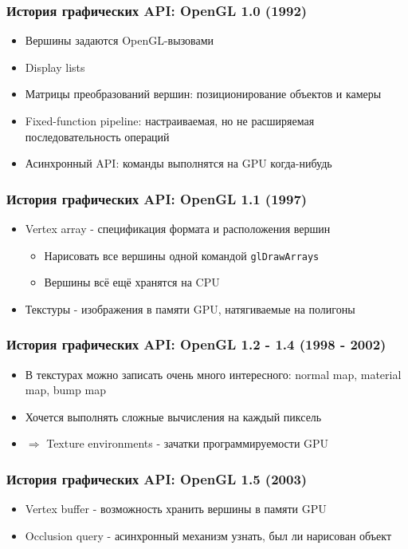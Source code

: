 \documentclass{beamer}
\begin{document}
\begin{frame}
\frametitle{История графических API: OpenGL 1.0 (1992)}
\begin{itemize}
\item Вершины задаются OpenGL-вызовами
\item Display lists
\item Матрицы преобразований вершин: позиционирование объектов и камеры
\item Fixed-function pipeline: настраиваемая, но не расширяемая последовательность операций
\item Асинхронный API: команды выполнятся на GPU когда-нибудь
\end{itemize}
\end{frame}

\begin{frame}[fragile]
\frametitle{История графических API: OpenGL 1.1 (1997)}
\begin{itemize}
\item Vertex array - спецификация формата и расположения вершин
\begin{itemize}
\item Нарисовать все вершины одной командой \verb|glDrawArrays|
\item Вершины всё ещё хранятся на CPU
\end{itemize}
\pause
\item Текстуры - изображения в памяти GPU, натягиваемые на полигоны
\end{itemize}
\end{frame}

\begin{frame}
\frametitle{История графических API: OpenGL 1.2 - 1.4 (1998 - 2002)}
\begin{itemize}
\item В текстурах можно записать очень много интересного: normal map, material map, bump map
\item Хочется выполнять сложные вычисления на каждый пиксель
\item $\Longrightarrow$ Texture environments - зачатки программируемости GPU
\end{itemize}
\end{frame}

\begin{frame}
\frametitle{История графических API: OpenGL 1.5 (2003)}
\begin{itemize}
\item Vertex buffer - возможность хранить вершины в памяти GPU
\pause
\item Occlusion query - асинхронный механизм узнать, был ли нарисован объект
\end{itemize}
\end{frame}
\end{document}
